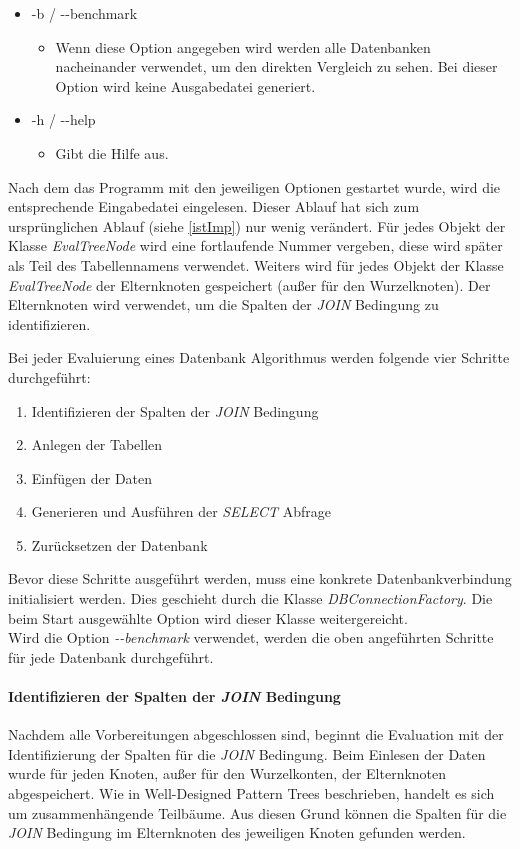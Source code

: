 \documentclass[draft,final]{vutinfth} %
\begin{document}
\begin{itemize}
\begin{itemize}
	\end{itemize} 
	\item -b / -{}-benchmark
	\begin{itemize}
		\item Wenn diese Option angegeben wird werden alle Datenbanken nacheinander verwendet, um den direkten Vergleich zu sehen. Bei dieser Option wird keine Ausgabedatei generiert.
	\end{itemize}  
	\item -h / -{}-help
	\begin{itemize}
		\item Gibt die Hilfe aus.
	\end{itemize} 
\end{itemize}

Nach dem das Programm mit den jeweiligen Optionen gestartet wurde, wird die entsprechende Eingabedatei eingelesen. Dieser Ablauf hat sich zum ursprünglichen Ablauf (siehe \ref{istImp}) nur wenig verändert. Für jedes Objekt der Klasse \textit{EvalTreeNode} wird eine fortlaufende Nummer vergeben, diese wird später als Teil des Tabellennamens verwendet. Weiters wird für jedes Objekt der Klasse \textit{EvalTreeNode} der Elternknoten gespeichert (au\ss er für den Wurzelknoten). Der Elternknoten wird verwendet, um die Spalten der \textit{JOIN} Bedingung zu identifizieren.

Bei jeder Evaluierung eines Datenbank Algorithmus werden folgende vier Schritte durchgeführt:

\begin{enumerate}
	\item Identifizieren der Spalten der \textit{JOIN} Bedingung
	\item Anlegen der Tabellen
	\item Einfügen der Daten
	\item Generieren und Ausführen der \textit{SELECT} Abfrage
	\item Zurücksetzen der Datenbank
\end{enumerate}

Bevor diese Schritte ausgeführt werden, muss eine konkrete Datenbankverbindung initialisiert werden. Dies geschieht durch die Klasse \textit{DBConnectionFactory}. Die beim Start ausgewählte Option wird dieser Klasse weitergereicht. \\
Wird die Option \textit{-{}-benchmark} verwendet, werden die oben angeführten Schritte für jede Datenbank durchgeführt. 


\paragraph{Identifizieren der Spalten der \textit{JOIN} Bedingung} \label{joinCols}
Nachdem alle Vorbereitungen abgeschlossen sind, beginnt die Evaluation mit der Identifizierung der Spalten für die \textit{JOIN} Bedingung. Beim Einlesen der Daten wurde für jeden Knoten, au\ss er für den Wurzelkonten, der Elternknoten abgespeichert. Wie in Well-Designed Pattern Trees \cite[S.~172]{OptMat} beschrieben, handelt es sich um zusammenhängende Teilbäume. Aus diesen Grund können die Spalten für die \textit{JOIN} Bedingung im Elternknoten des jeweiligen Knoten gefunden werden. 
\end{document}
